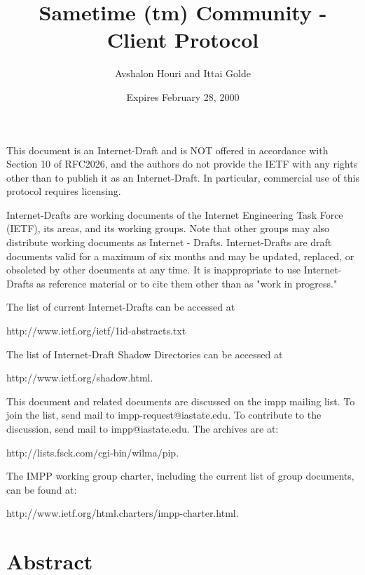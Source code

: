 \documentclass[titlepage,oneside]{book}
\begin{document}
\title{Sametime (tm) Community - Client Protocol}

\author{Avshalon Houri and Ittai Golde}

\date{Expires February 28, 2000}

\maketitle{}

\tableofcontents{}

\par{} This document is an Internet-Draft and is NOT
offered in accordance with Section 10 of RFC2026, and the authors do
not provide the IETF with any rights other than to publish it as an
Internet-Draft. In particular, commercial use of this protocol
requires licensing.

\par{} Internet-Drafts are working documents of the Internet
Engineering Task Force (IETF), its areas, and its working groups.
Note that other groups may also distribute working documents as
Internet - Drafts. Internet-Drafts are draft documents valid for a
maximum of six months and may be updated, replaced, or obsoleted by
other documents at any time. It is inappropriate to use
Internet-Drafts as reference material or to cite them other than as
"work in progress."

\par{} The list of current Internet-Drafts can be accessed at

\subpar{} http://www.ietf.org/ietf/1id-abstracts.txt

\par{} The list of Internet-Draft Shadow Directories can be accessed
at

\subpar{} http://www.ietf.org/shadow.html.

\par{} This document and related documents are discussed on the impp
mailing list. To join the list, send mail to impp-request@iastate.edu.
To contribute to the discussion, send mail to impp@iastate.edu.  The
archives are at:

\subpar{} http://lists.fsck.com/cgi-bin/wilma/pip.

\par{} The IMPP working group charter, including the current list of
group documents, can be found at:

\subpar{} http://www.ietf.org/html.charters/impp-charter.html.

\chapter{Abstract}
\end{document}

